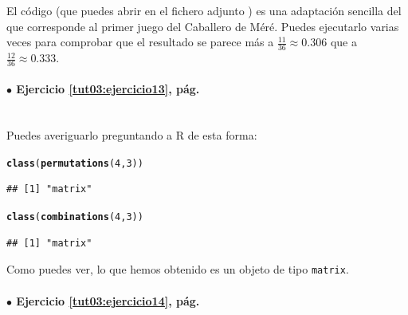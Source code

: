 \documentclass[10pt,a4paper]{article}\usepackage[]{graphicx}\usepackage[]{color}
\makeatletter
\newcommand{\hlnum}[1]{\textcolor[rgb]{0.686,0.059,0.569}{#1}}%
\newcommand{\hlstd}[1]{\textcolor[rgb]{0.345,0.345,0.345}{#1}}%
\newcommand{\hlkwd}[1]{\textcolor[rgb]{0.737,0.353,0.396}{\textbf{#1}}}%
\newenvironment{kframe}{%
 \def\at@end@of@kframe{}%
 \ifinner\ifhmode%
  \def\at@end@of@kframe{\end{minipage}}%
  \begin{minipage}{\columnwidth}%
 \fi\fi%
 \def\FrameCommand##1{\hskip\@totalleftmargin \hskip-\fboxsep
 \colorbox{shadecolor}{##1}\hskip-\fboxsep
     \hskip-\linewidth \hskip-\@totalleftmargin \hskip\columnwidth}%
 \MakeFramed {\advance\hsize-\width
   \@totalleftmargin\z@ \linewidth\hsize
   \@setminipage}}%
 {\par\unskip\endMakeFramed%
 \at@end@of@kframe}
\newenvironment{knitrout}{}{} %
\makeatother
\begin{document}
El código (que puedes abrir en el fichero adjunto ) es una adaptación sencilla del que corresponde al primer juego del Caballero de Méré. Puedes ejecutarlo varias veces para comprobar que el resultado se parece más a $\frac{11}{36}\approx0.306$ que a $\frac{12}{36}\approx0.333$.
\begin{knitrout}
\color{fgcolor}\begin{kframe}


{\ttfamily\noindent{}}

{\ttfamily\noindent\bfseries{}}\end{kframe}
\end{knitrout}





\paragraph{\bf $\bullet$ Ejercicio \ref{tut03:ejercicio13}, pág. \pageref{tut03:ejercicio13}}
\label{tut03:ejercicio13:sol}\quad\\

Puedes averiguarlo preguntando a R de esta forma:
\begin{knitrout}
\color{fgcolor}\begin{kframe}
\begin{alltt}
\hlkwd{class}\hlstd{(}\hlkwd{permutations}\hlstd{(}\hlnum{4}\hlstd{,}\hlnum{3}\hlstd{) )}
\end{alltt}
\begin{verbatim}
## [1] "matrix"
\end{verbatim}
\begin{alltt}
\hlkwd{class}\hlstd{(}\hlkwd{combinations}\hlstd{(}\hlnum{4}\hlstd{,}\hlnum{3}\hlstd{) )}
\end{alltt}
\begin{verbatim}
## [1] "matrix"
\end{verbatim}
\end{kframe}
\end{knitrout}
Como puedes ver, lo que hemos obtenido es un objeto de tipo {\tt matrix}.


\paragraph{\bf $\bullet$ Ejercicio \ref{tut03:ejercicio14}, pág. \pageref{tut03:ejercicio14}}
\label{tut03:ejercicio14:sol}\quad\\
\end{document}
